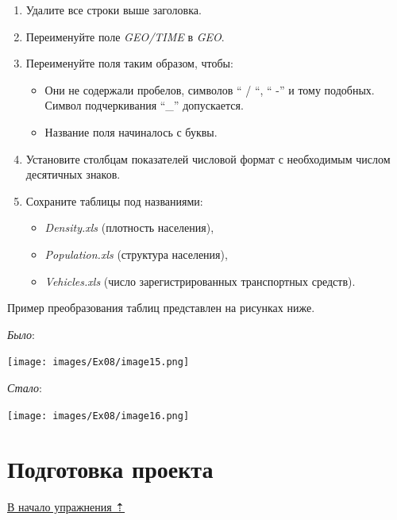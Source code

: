 \documentclass[12pt,]{book}
\providecommand{\tightlist}{%
  \setlength{\itemsep}{0pt}\setlength{\parskip}{0pt}}
\begin{document}
\begin{enumerate}
\def\labelenumi{\arabic{enumi}.}
\item
  Удалите все строки выше заголовка.
\item
  Переименуйте поле \emph{GEO/TIME} в \emph{GEO}.
\item
  Переименуйте поля таким образом, чтобы:

  \begin{itemize}
  \tightlist
  \item
    Они не содержали пробелов, символов `` / ``, `` -'' и тому подобных. Символ подчеркивания ``\_'' допускается.
  \item
    Название поля начиналось с буквы.
  \end{itemize}
\item
  Установите столбцам показателей числовой формат с необходимым числом десятичных знаков.
\item
  Сохраните таблицы под названиями:

  \begin{itemize}
  \tightlist
  \item
    \emph{Density.xls} (плотность населения),
  \item
    \emph{Population.xls} (структура населения),
  \item
    \emph{Vehicles.xls} (число зарегистрированных транспортных средств).
  \end{itemize}
\end{enumerate}

Пример преобразования таблиц представлен на рисунках ниже.

\emph{Было}:

\texttt{[image: images/Ex08/image15.png]}

\emph{Стало}:

\texttt{[image: images/Ex08/image16.png]}

\hypertarget{stat-map-economic-prepare}{%
\section{Подготовка проекта}\label{stat-map-economic-prepare}}

\protect\hyperlink{stat-map-economic}{В начало упражнения ⇡}
\end{document}
